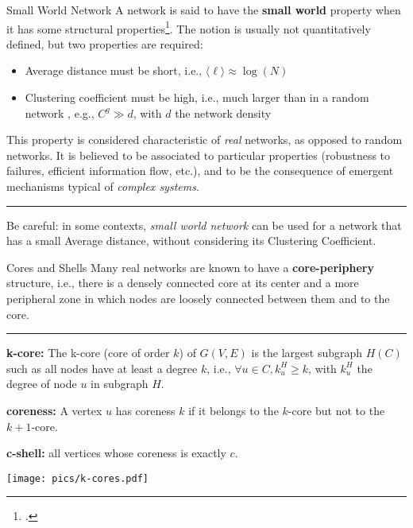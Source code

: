 \begin{textbox}{Small World Network}
    A network is said to have the \textbf{small world} property when it has some structural properties\footcite{watts1998collective}. The notion is usually not quantitatively defined, but two properties are required:
    \begin{itemize}
        \item Average distance must be short, i.e., $\langle\ell\rangle \approx \log(N)$
        \item Clustering coefficient must be high, i.e., much larger than in a random network , e.g., $C^g \gg d$, with $d$ the network density
    \end{itemize}

    This property is considered characteristic of \textit{real} networks, as opposed to random networks. It is believed to be associated to particular properties (robustness to failures, efficient information flow, etc.), and to be the consequence of emergent mechanisms typical of \textit{complex systems}.

    \noindent\rule{4cm}{0.1pt}

    Be careful: in some contexts, \textit{small world network} can be used for a network that has a small Average distance, without considering its Clustering Coefficient.
\end{textbox}


\begin{textbox}{Cores and Shells}
    Many real networks are known to have a \textbf{core-periphery} structure, i.e., there is a densely connected core at its center and a more peripheral zone in which nodes are loosely connected between them and to the core.

    \noindent\rule{4cm}{0.1pt}

    \textbf{k-core:} The  k-core (core of order $k$) of $G(V,E)$ is the largest subgraph $H(C)$ such as all nodes have at least a degree $k$, i.e.,  $\forall u \in C, {k}^H_u \geq k$, with $k^H_u$ the degree of node $u$ in subgraph $H$.

    \textbf{coreness:} A vertex $u$ has coreness $k$ if it belongs to the $k$-core but not to the $k+1$-core.

    \textbf{c-shell:} all vertices whose coreness is exactly $c$.

    \centering
    \texttt{[image: pics/k-cores.pdf]}
\end{textbox}


